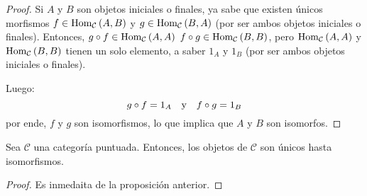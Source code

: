 \documentclass[12pt]{report}
\theoremstyle{largebreak}
\newcommand{\Hom}[3]{\ensuremath{\textup{Hom}_{#1}\left(#2,#3\right)}}
\begin{document}
    \begin{proof}
        Si $A$ y $B$ son objetos iniciales o finales, ya sabe que existen únicos morfismos $f\in\Hom{\mathcal{C}}{A}{B}$ y $g\in\Hom{\mathcal{C}}{B}{A}$ (por ser ambos objetos iniciales o finales). Entonces, $g\circ f\in \Hom{\mathcal{C}}{A}{A}$ $f\circ g\in \Hom{\mathcal{C}}{B}{B}$, pero $\Hom{\mathcal{C}}{A}{A}$ y $\Hom{\mathcal{C}}{B}{B}$ tienen un solo elemento, a saber $1_A$ y $1_B$ (por ser ambos objetos iniciales o finales).
        
        Luego:
        \begin{equation*}
            g\circ f =1_A\quad\textup{y}\quad f\circ g=1_B
        \end{equation*}
        por ende, $f$ y $g$ son isomorfismos, lo que implica que $A$ y $B$ son isomorfos.
    \end{proof}

    \begin{cor}
        Sea $\mathcal{C}$ una categoría puntuada. Entonces, los objetos de $\mathcal{C}$ son únicos hasta isomorfismos.
    \end{cor}

    \begin{proof}
        Es inmedaita de la proposición anterior.
    \end{proof}
\end{document}
